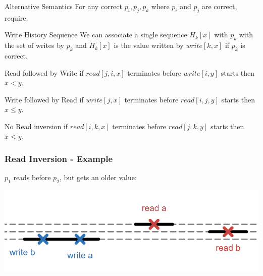 \begin{frame}{Alternative Semantics}
    For any correct $p_i, p_j, p_k$ where $p_i$ and $p_j$ are correct, require:
    \begin{block}{Write History Sequence}
        We can associate a single sequence $H_k[x]$ with $p_k$ with
        the set of writes by $p_k$ and 
        $H_k[x]$ is the value written by $write[k,x]$ if $p_k$ is correct.
    \end{block}
    \pause
    \begin{block}{Read followed by Write}
        if $read[j,i,x]$ terminates before $write[i,y]$ starts then $x<y$.
    \end{block}
    \pause
    \begin{block}{Write followed by Read}
        if $write[j,x]$ terminates before $read[i,j,y]$ starts then $x\leq y$.
    \end{block}
    \pause
    \begin{block}{No Read inversion}
        if $read[i,k,x]$ terminates before $read[j,k,y]$ starts then $x\leq y$.
    \end{block}    
\end{frame}

\begin{frame}
    \frametitle{Read Inversion - Example}
    $p_1$ reads before $p_2$, but gets
    an older value:
    \begin{center}
        \includegraphics[scale=.6]{resources/read_inversion_lines.png}
    \end{center}
\end{frame}

